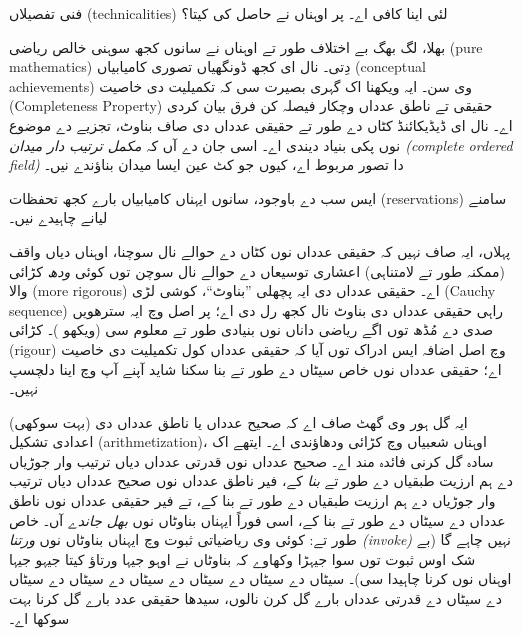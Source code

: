 \documentclass[../../../include/open-logic-section]{subfiles}
\begin{document}

فنی تفصیلاں (technicalities) لئی اینا کافی اے۔ پر اوہناں نے حاصل کی کیتا؟

بھلا، لگ بھگ بے اختلاف طور تے اوہناں نے سانوں کجھ {سوہنی} خالص ریاضی
(pure mathematics) دِتی۔ نال ای کجھ ڈونگھیاں تصوری کامیابیاں
(conceptual achievements) وی سن۔ ایہ ویکھنا اک گہری بصیرت سی کہ تکمیلیت
دی خاصیت (Completeness Property) حقیقی تے ناطق عدداں وچکار فیصلہ کن فرق
بیان کردی اے۔ نال ای ڈیڈیکائنڈ کٹاں دے طور تے حقیقی عدداں دی صاف
بناوٹ، تجزیے دے موضوع نوں پکی بنیاد دیندی اے۔ اسی جان دے آں کہ
\emph{مکمل ترتیب دار میدان (complete ordered field)} دا تصور مربوط اے، کیوں جو کٹ عین ایسا
میدان بناؤندے نیں۔

ایس سب دے باوجود، سانوں ایہناں کامیابیاں بارے کجھ تحفظات (reservations)
سامنے لیانے چاہیدے نیں۔

پہلاں، ایہ صاف نہیں کہ حقیقی عدداں نوں کٹاں دے حوالے نال سوچنا، اوہناں
دیاں واقف (ممکنہ طور تے لامتناہی) اعشاری توسیعاں دے حوالے نال سوچن توں
کوئی \emph{ودھ} کڑائی والا (more rigorous) اے۔ حقیقی عدداں دی ایہ پچھلی
”بناوٹ“، کوشی لڑی (Cauchy sequence)
راہی حقیقی عدداں دی بناوٹ نال کجھ رل دی اے؛ پر اصل وچ ایہ سترھویں صدی
دے مُڈھ توں اگے ریاضی داناں نوں بنیادی طور تے معلوم سی (ویکھو
)۔ کڑائی (rigour) وچ اصل اضافہ ایس ادراک توں آیا کہ
حقیقی عدداں کول تکمیلیت دی خاصیت اے؛ حقیقی عدداں نوں خاص سیٹاں دے طور تے
بنا سکنا شاید آپنے آپ وچ اینا دلچسپ نہیں۔

ایہ گل ہور وی گھٹ صاف اے کہ صحیح عدداں یا ناطق عدداں دی (بہت سوکھی)
اعدادی تشکیل (arithmetization)، اوہناں شعبیاں وچ کڑائی ودھاؤندی اے۔ ایتھے اک سادہ گل
کرنی فائدہ مند اے۔ صحیح عدداں نوں قدرتی عدداں دیاں ترتیب وار جوڑیاں دے
ہم ارزیت طبقیاں دے طور تے \emph{بنا} کے، فیر ناطق عدداں نوں صحیح عدداں
دیاں ترتیب وار جوڑیاں دے ہم ارزیت طبقیاں دے طور تے بنا کے، تے فیر
حقیقی عدداں نوں ناطق عدداں دے سیٹاں دے طور تے بنا کے، اسی فوراً ایہناں
بناوٹاں نوں \emph{بھل جاندے} آں۔ خاص طور تے: کوئی وی ریاضیاتی ثبوت
وچ ایہناں بناوٹاں نوں \emph{ورتنا (invoke)} نہیں چاہے گا (بے شک اوس ثبوت توں
سوا جیہڑا وکھاوے کہ بناوٹاں نے اوہو جیہا ورتاؤ کیتا جیہو جیہا اوہناں
نوں کرنا چاہیدا سی)۔ سیٹاں دے سیٹاں دے سیٹاں دے سیٹاں دے سیٹاں دے
سیٹاں دے سیٹاں دے قدرتی عدداں بارے گل کرن نالوں، سیدھا حقیقی عدد بارے
گل کرنا بہت سوکھا اے۔
%
%
%
\end{document}
